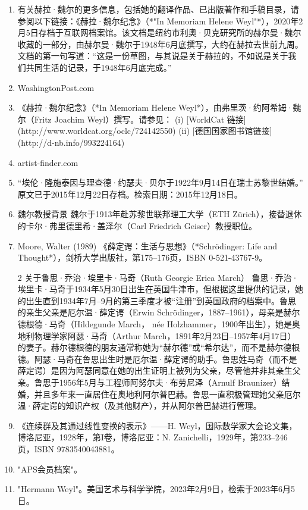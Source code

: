 \begin{enumerate}
\item 有关赫拉·魏尔的更多信息，包括她的翻译作品、已出版著作和手稿目录，请参阅以下链接：《赫拉·魏尔纪念》（*"In Memoriam Helene Weyl"*），2020年2月5日存档于互联网档案馆。该文档是纽约市利奥·贝克研究所的赫尔曼·魏尔收藏的一部分，由赫尔曼·魏尔于1948年6月底撰写，大约在赫拉去世前九周。文档的第一句写道：“这是一份草图，与其说是关于赫拉的，不如说是关于我们共同生活的记录，于1948年6月底完成。”  
\item WashingtonPost.com
\item 《赫拉·魏尔纪念》（*In Memoriam Helene Weyl*），由弗里茨·约阿希姆·魏尔（Fritz Joachim Weyl）撰写。请参见：  
(i) [WorldCat 链接](http://www.worldcat.org/oclc/724142550)  
(ii) [德国国家图书馆链接](http://d-nb.info/993224164)  
\item artist-finder.com
\item “埃伦·隆施泰因与理查德·约瑟夫·贝尔于1922年9月14日在瑞士苏黎世结婚。”  
原文已于2015年12月22日存档。检索日期：2015年12月18日。  
\item 魏尔教授背景 魏尔于1913年赴苏黎世联邦理工大学（ETH Zürich），接替退休的卡尔·弗里德里希·盖泽尔（Carl Friedrich Geiser）教授职位。
\item Moore, Walter (1989) 《薛定谔：生活与思想》（*Schrödinger: Life and Thought*），剑桥大学出版社，第175–176页，ISBN 0-521-43767-9。  
\item [2] 关于鲁思·乔治·埃里卡·马奇（Ruth Georgie Erica March）  
鲁思·乔治·埃里卡·马奇于1934年5月30日出生在英国牛津市，但根据这里提供的记录，她的出生直到1934年7月–9月的第三季度才被“注册”到英国政府的档案中。鲁思的亲生父亲是厄尔温·薛定谔（Erwin Schrödinger，1887–1961），母亲是赫尔德根德·马奇（Hildegunde March， née Holzhammer，1900年出生），她是奥地利物理学家阿瑟·马奇（Arthur March，1891年2月23日–1957年4月17日）的妻子。赫尔德根德的朋友通常称她为“赫尔德”或“希尔达”，而不是赫尔德根德。阿瑟·马奇在鲁思出生时是厄尔温·薛定谔的助手。鲁思姓马奇（而不是薛定谔）是因为阿瑟同意在她的出生证明上被列为父亲，尽管他并非其亲生父亲。鲁思于1956年5月与工程师阿努尔夫·布劳尼泽（Arnulf Braunizer）结婚，并且多年来一直居住在奥地利阿尔普巴赫。鲁思一直积极管理她父亲厄尔温·薛定谔的知识产权（及其他财产），并从阿尔普巴赫进行管理。
\item 《连续群及其通过线性变换的表示》——H. Weyl，国际数学家大会论文集，博洛尼亚，1928年，第I卷，博洛尼亚：N. Zanichelli，1929年，第233–246页，ISBN 9783540043881。
\item "APS会员档案"。
\item "Hermann Weyl"。美国艺术与科学学院，2023年2月9日，检索于2023年6月5日。

\end{enumerate}